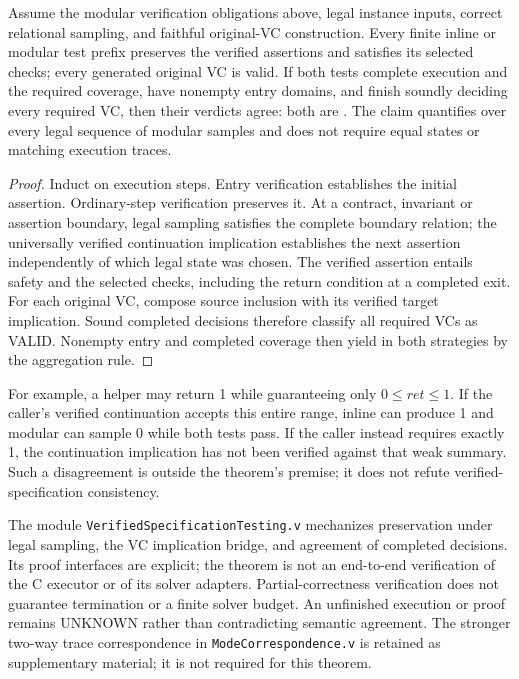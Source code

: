 \begin{theorem}
\label{supp:verified-specification-theorem}
Assume the modular verification obligations above, legal instance inputs,
correct relational sampling, and faithful original-VC construction.
Every finite inline or modular test prefix preserves the verified
assertions and satisfies its selected checks; every generated original VC
is valid. If both tests complete execution and the required coverage, have
nonempty entry domains, and finish soundly deciding every required VC, then
their verdicts agree: both are \pass{}. The claim quantifies over every
legal sequence of modular samples and does not require equal states or
matching execution traces.
\end{theorem}
\begin{proof}
Induct on execution steps. Entry verification establishes the initial
assertion. Ordinary-step verification preserves it. At a contract,
invariant or assertion boundary, legal sampling satisfies the complete
boundary relation; the universally verified continuation implication
establishes the next assertion independently of which legal state was
chosen. The verified assertion entails safety and the selected checks,
including the return condition at a completed exit.
For each original VC, compose source inclusion with its verified target
implication. Sound completed decisions therefore classify all required VCs
as VALID. Nonempty entry and completed coverage then yield \pass{} in both
strategies by the aggregation rule.
\end{proof}

For example, a helper may return 1 while guaranteeing only
$0\le\mathit{ret}\le1$. If the caller's verified continuation accepts this
entire range, inline can produce 1 and modular can sample 0 while both tests
pass. If the caller instead requires exactly 1, the continuation implication
has not been verified against that weak summary. Such a disagreement is
outside the theorem's premise; it does not refute verified-specification
consistency.

The module \texttt{VerifiedSpecificationTesting.v} mechanizes preservation
under legal sampling, the VC implication bridge, and agreement of completed
decisions. Its proof interfaces are explicit; the theorem is not an
end-to-end verification of the C executor or of its solver adapters.
Partial-correctness verification does not guarantee termination or a finite
solver budget. An unfinished execution or proof remains UNKNOWN rather
than contradicting semantic agreement.
The stronger two-way trace correspondence in \texttt{ModeCorrespondence.v}
is retained as supplementary material; it is not required for this theorem.

